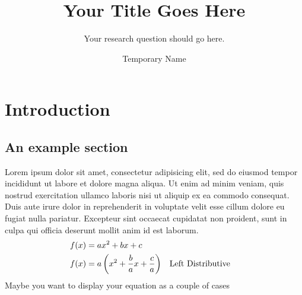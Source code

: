 \documentclass[a4paper, openany, 12pt]{maatext}
\numberwithin{section}{chapter}
\numberwithin{equation}{chapter}
\begin{document}



\title{Your Title Goes Here}

\subtitle{Your research question should go here.}

\author{Temporary Name}


\maketitle

\cleardoublepage

\tableofcontents

\mainmatter%

\chapter{Introduction}

\section{An example section}

Lorem ipsum dolor sit amet, consectetur adipisicing elit, sed do eiusmod tempor incididunt ut labore et dolore magna aliqua. Ut enim ad minim veniam, quis nostrud exercitation ullamco laboris nisi ut aliquip ex ea commodo consequat. Duis aute irure dolor in reprehenderit in voluptate velit esse cillum dolore eu fugiat nulla pariatur. Excepteur sint occaecat cupidatat non proident, sunt in culpa qui officia deserunt mollit anim id est laborum.
\begin{align}
  f(x) &= ax^2+bx+c \label{eqn:quadratic} \\
  f(x) &= a\left(x^2 + \frac{b}{a}x + \frac{c}{a} \right) && \text{Left Distributive}
\end{align}
Maybe you want to display your equation as a couple of cases
\end{document}
